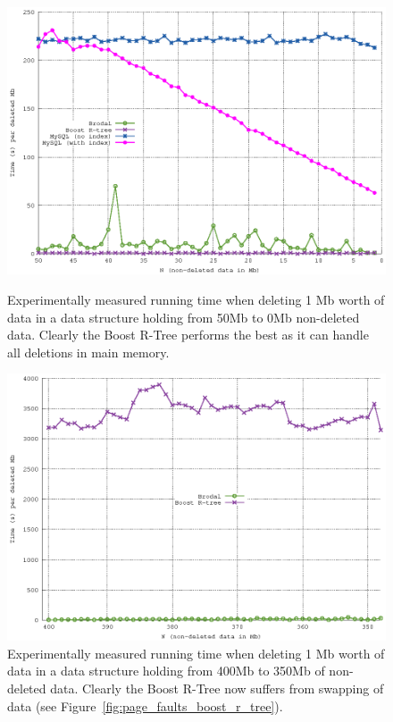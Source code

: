 \documentclass[twoside,11pt,openright]{report}
\begin{document}
\begin{figure}[htp!]
\centering
\includegraphics[width=\textwidth]{../src/experiments/delete_experiment_results/2016-05-27.10_10_14/time4}
\caption{Experimentally measured running time when deleting 1 Mb worth of data in a data structure holding from 50Mb to 0Mb non-deleted data. Clearly the Boost R-Tree performs the best as it can handle all deletions in main memory.}
\label{fig:delete_complexity_result_zoomed}
\includegraphics[width=\textwidth]{../src/experiments/delete_experiment_results/2016-05-31.08_55_51/time2}
\caption{Experimentally measured running time when deleting 1 Mb worth of data in a data structure holding from 400Mb to 350Mb of non-deleted data. Clearly the Boost R-Tree now suffers from swapping of data (see Figure~\ref{fig:page_faults_boost_r_tree}).}
\label{fig:delete_complexity_result_400Mb}
\end{figure}
\end{document}
